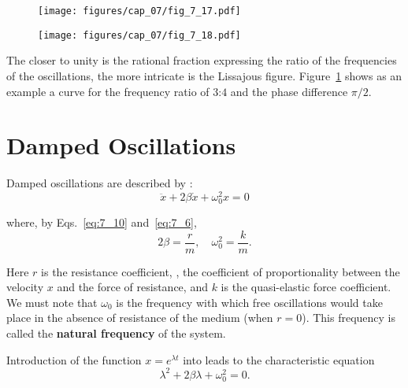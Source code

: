 \begin{figure}[t]
	\begin{minipage}[t]{0.5\linewidth}
		\begin{center}
			\texttt{[image: figures/cap\_07/fig\_7\_17.pdf]}
			\caption[]{}
			\label{fig:7_17}
		\end{center}
	\end{minipage}
	\hspace{-0.05cm}
	\begin{minipage}[t]{0.5\linewidth}
		\begin{center}
			\texttt{[image: figures/cap\_07/fig\_7\_18.pdf]}
			\caption[]{}
			\label{fig:7_18}
		\end{center}
	\end{minipage}
	\vspace{-0.6cm}
\end{figure}

The closer to unity is the rational fraction expressing the ratio of the frequencies of the oscillations, the more intricate is the Lissajous figure. Figure~\ref{fig:7_18} shows as an example a curve for the frequency ratio of $3$:$4$ and the phase difference $\pi/2$.

\section{Damped Oscillations}\label{sec:7_10}

Damped oscillations are described by :
\begin{equation*}
	\ddot{x} + 2\beta\dot{x} + \omega_0^2 x = 0
\end{equation*}

\noindent
where, by Eqs.~\eqref{eq:7_10} and~\eqref{eq:7_6},
\begin{equation*}
	2\beta = \frac{r}{m},\quad \omega_0^2 = \frac{k}{m}.
\end{equation*}

\noindent
Here $r$ is the resistance coefficient, \ie, the coefficient of proportionality between the velocity $x$ and the force of resistance, and $k$ is the quasi-elastic force coefficient. We must note that $\omega_0$ is the frequency with which free oscillations would take place in the absence of resistance of the medium (when $r=0$). This frequency is called the \textbf{natural frequency} of the system.

Introduction of the function $x=e^{\lambda t}$ into  leads to the characteristic equation
\begin{equation}\label{eq:7_98}
	\lambda^2 + 2\beta\lambda + \omega_0^2 = 0.
\end{equation}

